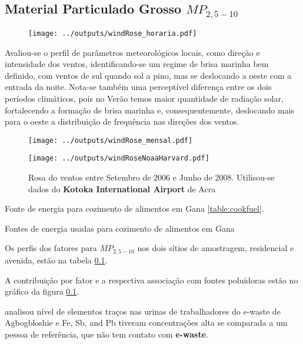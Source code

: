 \subsection{Material Particulado Grosso $MP_{2,5-10}$}

\begin{figure}[H]
  \centering
  \texttt{[image: ../outputs/windRose\_horaria.pdf]}
  \caption{ \citep{carslaw2012} \label{fig:windRose_horaria}}
\end{figure}

Avaliou-se o perfil de parâmetros meteorológicos locais, como direção e 
intensidade dos ventos, identificando-se um regime de brisa marinha bem 
definido, com ventos de sul quando sol a pino, mas se deslocando a oeste com a 
entrada da noite. 
Nota-se também uma perceptível diferença entre os dois períodos climáticos, 
pois no Verão temos maior quantidade de radiação solar, fortalecendo a 
formação de brisa marinha e, consequentemente, deslocando mais para o 
oeste a distribuição de frequência nas direções dos ventos.

\begin{figure}[H]
  \centering
  \texttt{[image: ../outputs/windRose\_mensal.pdf]}
  \caption{ \citep{carslaw2012} \label{fig:windRose_mensal}}
\end{figure}

\begin{figure}[H]
  \centering
  \texttt{[image: ../outputs/windRoseNoaaHarvard.pdf]}
  \caption{Rosa do ventos entre
           Setembro de 2006 e Junho de 2008. Utilisou-se dados 
           do \textbf{Kotoka International Airport} de Acra \label{fg:rosaCompleta}}
\end{figure}

Fonte de energia para cozimento de alimentos em Gana \ref{table:cookfuel}.
\begin{table}[H]
 \centering
  
  \caption{Fontes de energia usadas para cozimento de alimentos em 
           Gana \citep{ghanacensus2013} \label{table:cookfuel}}
\end{table}

Os perfis dos fatores para $MP_{2,5-10}$ nos dois sítios de amostragem, 
residencial e avenida, estão na tabela \ref{}.

A contribuição por fator e a respectiva associação com fontes poluídoras
estão no gráfico da figura \ref{}. 

\citep{asante2012} analisou nível de elementos traços nas urinas de trabalhadores 
do e-waste de Agbogbloshie e Fe, Sb, and Pb tiveram concentrações alta se comparada
a um pessoa de referência, que não tem contato com \textbf{e-waste}.

